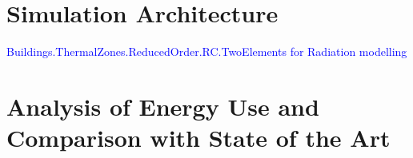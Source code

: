 \section{Simulation Architecture}
\textcolor{blue}{Buildings.ThermalZones.ReducedOrder.RC.TwoElements for Radiation modelling}

\section{Analysis of Energy Use and Comparison with State of the Art}
\label{sec:sim-energy-and-comparison}

